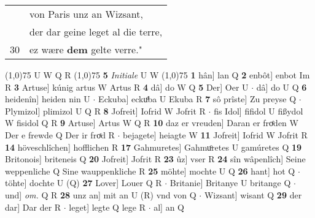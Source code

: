 \documentclass[8pt,a4paper,notitlepage]{article}
\begin{document}
\begin{table}[ht]
\begin{minipage}[t]{0.5\linewidth}
\begin{tabular}{rl}
 & von Paris unz an Wizsant,\\ 
 & der dar geine leget al die terre,\\ 
30 & ez wære \textbf{dem} gelte verre."\\ 
\end{tabular}
\scriptsize
\line(1,0){75} \newline
U W Q R \newline
\line(1,0){75} \newline
\textbf{5} \textit{Initiale} U W  \newline
\line(1,0){75} \newline
\textbf{1} hân] lan Q \textbf{2} enbôt] enbot Im R \textbf{3} Artuse] kúnig artus W Artus R \textbf{4} dâ] do W Q \textbf{5} Der] Oer U  $\cdot$ dâ] do U Q \textbf{6} heidenîn] heiden nin U  $\cdot$ Eckuba] eckuͦba U Ekuba R \textbf{7} sô prîste] Zu preyse Q  $\cdot$ Plymizol] plimizol U Q R \textbf{8} Jofreit] Iofrid W Jofrit R  $\cdot$ fis Idol] fifidol U fißydol W fisidol Q R \textbf{9} Artuse] Artus W Q R \textbf{10} daz er vreuden] Daran er froͤden W Der e frewde Q Der ir froͯd R  $\cdot$ bejagete] heiagte W \textbf{11} Jofreit] Iofrid W Jofrit R \textbf{14} höveschlîchen] hofflichen R \textbf{17} Gahmuretes] Gahmuͦretes U gamúretes Q \textbf{19} Britonois] briteneis Q \textbf{20} Jofreit] Jofrit R \textbf{23} ûz] vser R \textbf{24} sîn wâpenlîch] Seine weppenliche Q Sine wauppenkliche R \textbf{25} möhte] mochte U Q \textbf{26} hant] hot Q  $\cdot$ töhte] dochte U (Q) \textbf{27} Lover] Louer Q R  $\cdot$ Britanie] Britanye U britange Q  $\cdot$ und] \textit{om.} Q R \textbf{28} unz an] mit an U (R) vnd von Q  $\cdot$ Wizsant] wisant Q \textbf{29} der dar] Dar der R  $\cdot$ leget] legte Q lege R  $\cdot$ al] an Q \newline
\end{minipage}
\end{table}
\end{document}
